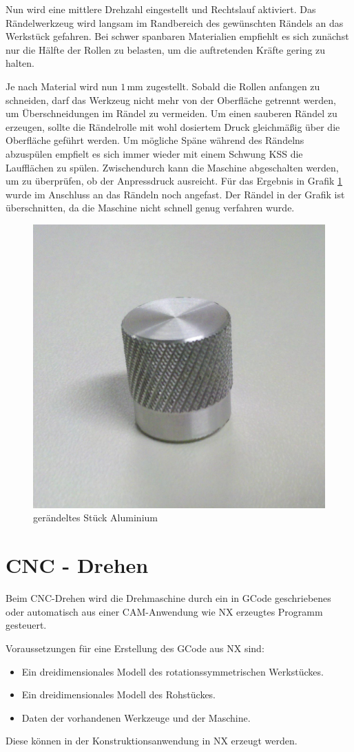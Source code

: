 \documentclass{\basedir/fablab-document}
\begin{document}
Nun wird eine mittlere Drehzahl eingestellt und Rechtslauf aktiviert. 
Das Rändelwerkzeug wird langsam im Randbereich des gewünschten Rändels an das Werkstück gefahren. 
Bei schwer spanbaren Materialien empfiehlt es sich zunächst nur die Hälfte der Rollen zu belasten, um die auftretenden Kräfte gering zu halten.

Je nach Material wird nun $1$\,mm zugestellt. Sobald die Rollen anfangen zu schneiden, darf das Werkzeug nicht mehr von der Oberfläche getrennt werden, um Überschneidungen im Rändel zu vermeiden.
Um einen sauberen Rändel zu erzeugen, sollte die Rändelrolle mit wohl dosiertem Druck gleichmäßig über die Oberfläche geführt werden.
Um mögliche Späne während des Rändelns abzuspülen empfielt es sich immer wieder mit einem Schwung KSS die Laufflächen zu spülen.
Zwischendurch kann die Maschine abgeschalten werden, um zu überprüfen, ob der Anpressdruck ausreicht.
Für das Ergebnis in Grafik \ref{fig:raendel} wurde im Anschluss an das Rändeln noch angefast.
Der Rändel in der Grafik ist überschnitten, da die Maschine nicht schnell genug verfahren wurde.

\begin{figure}[hb]
\caption{gerändeltes Stück Aluminium}
\label{fig:raendel}
\centering
\includegraphics[width=.5\linewidth]{img/raendel}
\end{figure}
\newpage
\section{CNC - Drehen}

Beim CNC-Drehen wird die Drehmaschine durch ein in GCode geschriebenes oder automatisch aus einer CAM-Anwendung wie NX erzeugtes Programm gesteuert.

Voraussetzungen für eine Erstellung des GCode aus NX sind:
\begin{itemize}
	\item Ein dreidimensionales Modell des rotationssymmetrischen Werkstückes.
	\item Ein dreidimensionales Modell des Rohstückes.
	\item Daten der vorhandenen Werkzeuge und der Maschine.
\end{itemize}
Diese können in der Konstruktionsanwendung in NX erzeugt werden.
\end{document}
